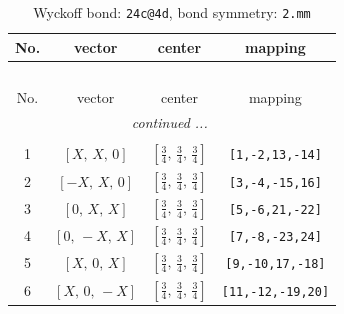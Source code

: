 \documentclass[fleqn,8pt]{jsarticle}
\begin{document}
\begin{longtable}{cccc}
\caption{Wyckoff bond: {\tt 24c@4d}, bond symmetry: {\tt 2.mm}}
 \\
 \hline \hline
No. & vector & center & mapping \\ \hline \endfirsthead

\multicolumn{3}{l}{\tablename\ \thetable{}} \\
 \hline \hline
No. & vector & center & mapping \\ \hline \endhead

 \hline \hline
\multicolumn{3}{r}{\footnotesize\it continued ...} \\ \endfoot

 \hline \hline
\multicolumn{3}{r}{} \\ \endlastfoot

1 & $\left[ X,\, X,\, 0 \right]$ & $\left[ \frac{3}{4},\, \frac{3}{4},\, \frac{3}{4} \right]$ & {\tt [1,-2,13,-14]} \\ \hline
2 & $\left[ - X,\, X,\, 0 \right]$ & $\left[ \frac{3}{4},\, \frac{3}{4},\, \frac{3}{4} \right]$ & {\tt [3,-4,-15,16]} \\ \hline
3 & $\left[ 0,\, X,\, X \right]$ & $\left[ \frac{3}{4},\, \frac{3}{4},\, \frac{3}{4} \right]$ & {\tt [5,-6,21,-22]} \\ \hline
4 & $\left[ 0,\, - X,\, X \right]$ & $\left[ \frac{3}{4},\, \frac{3}{4},\, \frac{3}{4} \right]$ & {\tt [7,-8,-23,24]} \\ \hline
5 & $\left[ X,\, 0,\, X \right]$ & $\left[ \frac{3}{4},\, \frac{3}{4},\, \frac{3}{4} \right]$ & {\tt [9,-10,17,-18]} \\ \hline
6 & $\left[ X,\, 0,\, - X \right]$ & $\left[ \frac{3}{4},\, \frac{3}{4},\, \frac{3}{4} \right]$ & {\tt [11,-12,-19,20]} \\
\end{longtable}
\renewcommand{\arraystretch}{1.2}
\end{document}

